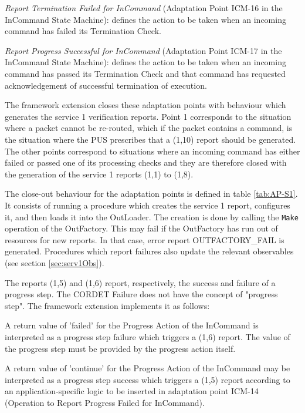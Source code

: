 \documentclass[a4paper,10pt]{article}
\newenvironment{fw_itemize}						%
{\begin{itemize}
  \setlength{\itemsep}{1mm}
  \setlength{\parskip}{0pt}
  \setlength{\parsep}{0pt}}
{\end{itemize}}
\newenvironment{fw_enumerate}					%
{\begin{enumerate}
  \setlength{\itemsep}{1mm}
  \setlength{\parskip}{0pt}
  \setlength{\parsep}{0pt}}
{\end{enumerate}}
\begin{document}
\begin{fw_enumerate}
\item \textit{Report Termination Failed for InCommand} (Adaptation Point ICM-16 in the InCommand State Machine): defines the action to be taken when an incoming command has failed its Termination Check.
\item \textit{Report Progress Successful for InCommand} (Adaptation Point ICM-17 in the InCommand State Machine): defines the action to be taken when an incoming command has passed its Termination Check and that command has requested acknowledgement of successful termination of execution.
\end{fw_enumerate}

The framework extension closes these adaptation points with behaviour which generates the service 1 verification reports. Point 1 corresponds to the situation where a packet cannot be re-routed, which if the packet contains a command, is the situation where the PUS prescribes that a (1,10) report should be generated. The other points correspond to situations where an incoming command has either failed or passed one of its processing checks and they are therefore closed with the generation of the service 1 reports (1,1) to (1,8). 

The close-out behaviour for the adaptation points is defined in table \ref{tab:AP-S1}. It consists of running a procedure which creates the service 1 report, configures it, and then loads it into the OutLoader. The creation is done by calling the \texttt{Make} operation of the OutFactory. This may fail if the OutFactory has run out of resources for new reports. In that case, error report OUTFACTORY\_FAIL is generated. Procedures which report failures also update the relevant observables (see section \ref{sec:serv1Obs}).

The reports (1,5) and (1,6) report, respectively, the success and failure of a progress step. The CORDET Failure does not have the concept of "progress step". The framework extension implements it as follows:

\begin{fw_itemize}
\item A return value of 'failed' for the Progress Action of the InCommand is interpreted as a progress step failure which triggers a (1,6) report. The value of the progress step must be provided by the progress action itself.
\item A return value of 'continue' for the Progress Action of the InCommand may be interpreted as a progress step success which triggers a (1,5) report according to an application-specific logic to be inserted in adaptation point ICM-14 (Operation to Report Progress Failed for InCommand). 
\end{fw_itemize}
\end{document}
